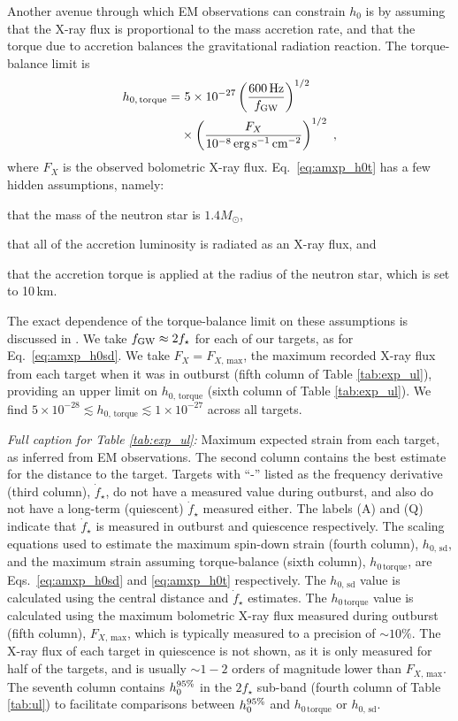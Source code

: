 Another avenue through which EM observations can constrain $h_0$ is by assuming that the X-ray flux is proportional to the mass accretion rate, and that the torque due to accretion balances the gravitational radiation reaction. The torque-balance limit is \cite{Riles2013a, Zhang2021}
\begin{align}
h_{0,\,\textrm{torque}} = &~5\times 10 ^{-27}\left(\frac{600\,\textrm{Hz}}{f_\textrm{GW}}\right)^{1/2} \nonumber \\
						&\times \left(\frac{F_X}{10^{-8}\,\textrm{erg\,s$^{-1}\,$cm$^{-2}$}}\right)^{1/2}\ ,  \label{eq:amxp_h0t}
\end{align}
where $F_X$ is the observed bolometric X-ray flux. Eq.~\eqref{eq:amxp_h0t} has a few hidden assumptions, namely: \begin{enumerate*}
\item that the mass of the neutron star is $1.4M_\odot$,
\item that all of the accretion luminosity is radiated as an X-ray flux, and
\item that the accretion torque is applied at the radius of the neutron star, which is set to 10\,km.
\end{enumerate*}
The exact dependence of the torque-balance limit on these assumptions is discussed in \citet{Zhang2021}. We take $f_{\rm GW} \approx 2 f_\star$ for each of our targets, as for Eq.~\eqref{eq:amxp_h0sd}. We take $F_X = F_{X,\,\textrm{max}}$, the maximum recorded X-ray flux from each target when it was in outburst (fifth column of Table \ref{tab:exp_ul}), providing an upper limit on $h_{0,\,\textrm{torque}}$ (sixth column of Table \ref{tab:exp_ul}). We find $5\times 10^{-28} \lesssim h_{0,\,\textrm{torque}} \lesssim 1\times 10^{-27}$ across all targets. 

\emph{Full caption for Table \ref{tab:exp_ul}:} Maximum expected strain from each target, as inferred from EM observations. The second column contains the best estimate for the distance to the target. Targets with ``-'' listed as the frequency derivative (third column), $\dot{f}_\star$, do not have a measured value during outburst, and also do not have a long-term (quiescent) $\dot{f}_\star$ measured either. The labels (A) and (Q) indicate that $\dot{f}_\star$ is measured in outburst and quiescence respectively. The scaling equations used to estimate the maximum spin-down strain (fourth column), $h_{0,\,\textrm{sd}}$, and the maximum strain assuming torque-balance (sixth column), $h_{0\,\textrm{torque}}$, are Eqs.~\eqref{eq:amxp_h0sd} and \eqref{eq:amxp_h0t} respectively. The $h_{0,\,\textrm{sd}}$ value is calculated using the central distance and $\dot{f}_\star$ estimates. The $h_{0\,\textrm{torque}}$ value is calculated using the maximum bolometric X-ray flux measured during outburst (fifth column), $F_{X,\,\textrm{max}}$, which is typically measured to a precision of $\sim10\%$. The X-ray flux of each target in quiescence is not shown, as it is only measured for half of the targets, and is usually $\sim1-2$ orders of magnitude lower than $F_{X,\,\textrm{max}}$. The seventh column contains $h_0^{95\%}$ in the $2f_\star$ sub-band (fourth column of Table \ref{tab:ul}) to facilitate comparisons between $h_0^{95\%}$ and $h_{0\,\textrm{torque}}$ or $h_{0,\,\textrm{sd}}$.

